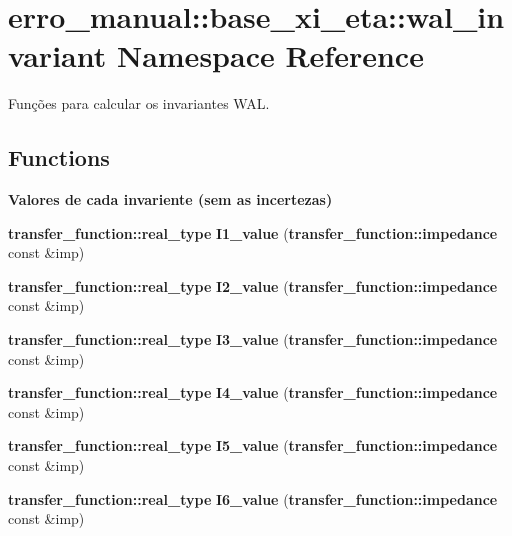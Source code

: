 \section{erro\_\-manual::base\_\-xi\_\-eta::wal\_\-invariant Namespace Reference}
\label{namespaceerro__manual_1_1base__xi__eta_1_1wal__invariant}
Funções para calcular os invariantes WAL.  


\subsection*{Functions}
\begin{Indent}{\bf Valores de cada invariente (sem as incertezas)}\par
\begin{CompactItemize}
\item 
{\bf transfer\_\-function::real\_\-type} \textbf{I1\_\-value} ({\bf transfer\_\-function::impedance} const \&imp)\label{namespaceerro__manual_1_1base__xi__eta_1_1wal__invariant_ef17311f213159798c257c41cb0017bc}

\item 
{\bf transfer\_\-function::real\_\-type} \textbf{I2\_\-value} ({\bf transfer\_\-function::impedance} const \&imp)\label{namespaceerro__manual_1_1base__xi__eta_1_1wal__invariant_676afb2c00af7452a8b0cbb28622ae60}

\item 
{\bf transfer\_\-function::real\_\-type} \textbf{I3\_\-value} ({\bf transfer\_\-function::impedance} const \&imp)\label{namespaceerro__manual_1_1base__xi__eta_1_1wal__invariant_d6a23c2ce2bd2cbb198999ae2e3e6d7a}

\item 
{\bf transfer\_\-function::real\_\-type} \textbf{I4\_\-value} ({\bf transfer\_\-function::impedance} const \&imp)\label{namespaceerro__manual_1_1base__xi__eta_1_1wal__invariant_dbe29d5f9de1ab0ad67d12ba4e679b2d}

\item 
{\bf transfer\_\-function::real\_\-type} \textbf{I5\_\-value} ({\bf transfer\_\-function::impedance} const \&imp)\label{namespaceerro__manual_1_1base__xi__eta_1_1wal__invariant_7e136ae4806df372e62e08219aa87db6}

\item 
{\bf transfer\_\-function::real\_\-type} \textbf{I6\_\-value} ({\bf transfer\_\-function::impedance} const \&imp)\label{namespaceerro__manual_1_1base__xi__eta_1_1wal__invariant_4713acaf09a126a8dfbff98bda48a628}


\end{CompactItemize}
\end{Indent}
